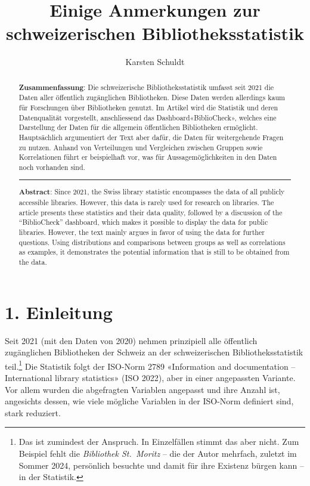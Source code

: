 \documentclass[a4paper,
fontsize=11pt,
oneside,
numbers=noperiodatend,
parskip=half-,
bibliography=totoc,
final
]{scrartcl}
\title{\LARGE{Einige Anmerkungen zur schweizerischen Bibliotheksstatistik}}%
\author{Karsten Schuldt} %
\date{}
\begin{document}
\maketitle
\thispagestyle{fancyplain} 

\begin{abstract}
\noindent
\textbf{Zusammenfassung}: Die schweizerische Bibliotheksstatistik umfasst
seit 2021 die Daten aller öffentlich zugänglichen Bibliotheken. Diese
Daten werden allerdings kaum für Forschungen über Bibliotheken genutzt.
Im Artikel wird die Statistik und deren Datenqualität vorgestellt,
anschliessend das Dashboard«BiblioCheck», welches eine Darstellung der
Daten für die allgemein öffentlichen Bibliotheken ermöglicht.
Hauptsächlich argumentiert der Text aber dafür, die Daten für
weitergehende Fragen zu nutzen. Anhand von Verteilungen und Vergleichen
zwischen Gruppen sowie Korrelationen führt er beispielhaft vor, was für
Aussagemöglichkeiten in den Daten noch vorhanden sind.

\begin{center}\rule{0.5\linewidth}{0.5pt}\end{center}

\noindent\textbf{Abstract}: Since 2021, the Swiss library statistic encompasses
the data of all publicly accessible libraries. However, this data is
rarely used for research on libraries. The article presents these
statistics and their data quality, followed by a discussion of the
\enquote{BiblioCheck} dashboard, which makes it possible to display the data
for public libraries. However, the text mainly argues in favor of using
the data for further questions. Using distributions and comparisons
between groups as well as correlations as examples, it demonstrates the
potential information that is still to be obtained from the data.
\end{abstract}

\section{1. Einleitung}\label{einleitung}

Seit 2021 (mit den Daten von 2020) nehmen prinzipiell alle öffentlich
zugänglichen Bibliotheken der Schweiz an der schweizerischen
Bibliotheksstatistik teil.\footnote{Das ist zumindest der Anspruch. In
  Einzelfällen stimmt das aber nicht. Zum Beispiel fehlt die
  \emph{Bibliothek St.~Moritz} -- die der Autor mehrfach, zuletzt im
  Sommer 2024, persönlich besuchte und damit für ihre Existenz bürgen
  kann -- in der Statistik.} Die Statistik folgt der ISO-Norm 2789
«Information and documentation -- International library statistics» (ISO
2022), aber in einer angepassten Variante. Vor allem wurden die
abgefragten Variablen angepasst und ihre Anzahl ist, angesichts dessen,
wie viele mögliche Variablen in der ISO-Norm definiert sind, stark
reduziert.
\end{document}
